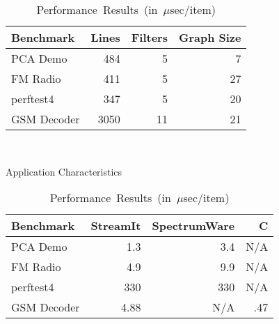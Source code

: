 \begin{table}[t]
\begin{minipage}{2.05in}
\centering
\scriptsize
\begin{tabular}{|l|r|r|r|} \hline
Benchmark & Lines & Filters & Graph Size\\
\hline \hline
PCA Demo & 484 & 5 & 7\\
\hline
FM Radio & 411 & 5 & 27\\
\hline
perftest4 & 347 & 5 & 20\\
\hline
GSM Decoder & 3050 & 11 & 21 \\
\hline
\end{tabular} \\
\vspace{6pt}
\caption{\protect\small Application Characteristics
\label{tab:benchmarks}}
\end{minipage}
\hspace{0.2in}
\begin{minipage}{2.5in}
\centering
\scriptsize
\begin{tabular}{|l|r|r|r|} \hline
Benchmark & StreamIt & SpectrumWare & C \\
\hline \hline
PCA Demo & 1.3 & 3.4 & N/A\\
\hline
FM Radio & 4.9 & 9.9 & N/A\\
\hline
perftest4 & 330 & 330 & N/A\\
\hline
GSM Decoder & 4.88 & N/A & .47\\
\hline
\end{tabular} \\
\vspace{6pt}
\caption{\protect\small \mbox{Performance Results (in $\mu$sec/item)}
\label{tab:performance}}
\end{minipage}
\vspace{-12pt}
\end{table}



